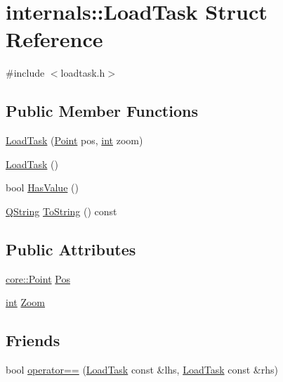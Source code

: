 \hypertarget{structinternals_1_1_load_task}{\section{internals\-:\-:Load\-Task Struct Reference}
\label{structinternals_1_1_load_task}
}


{\ttfamily \#include $<$loadtask.\-h$>$}

\subsection*{Public Member Functions}
\begin{DoxyCompactItemize}
\item 
\hyperlink{group___o_p_map_widget_gaef6bad3b01c5866351b69c90979f260e}{Load\-Task} (\hyperlink{structcore_1_1_point}{Point} pos, \hyperlink{ioapi_8h_a787fa3cf048117ba7123753c1e74fcd6}{int} zoom)
\item 
\hyperlink{group___o_p_map_widget_gab83d811cb8cb0cb08d8c56cad76df071}{Load\-Task} ()
\item 
bool \hyperlink{group___o_p_map_widget_ga158bba758e9847d68a36eb0efee84342}{Has\-Value} ()
\item 
\hyperlink{group___u_a_v_objects_plugin_gab9d252f49c333c94a72f97ce3105a32d}{Q\-String} \hyperlink{group___o_p_map_widget_gadf111b2f1982ddca99c4a295856c3968}{To\-String} () const 
\end{DoxyCompactItemize}
\subsection*{Public Attributes}
\begin{DoxyCompactItemize}
\item 
\hyperlink{structcore_1_1_point}{core\-::\-Point} \hyperlink{group___o_p_map_widget_gaaaf77679e16ef9213c85fbfaff467339}{Pos}
\item 
\hyperlink{ioapi_8h_a787fa3cf048117ba7123753c1e74fcd6}{int} \hyperlink{group___o_p_map_widget_gaee096bc3882220e2ed2b8b167cecb9ad}{Zoom}
\end{DoxyCompactItemize}
\subsection*{Friends}
\begin{DoxyCompactItemize}
\item 
bool \hyperlink{group___o_p_map_widget_ga6780adf9ff8340f912353a6ef6e68751}{operator==} (\hyperlink{structinternals_1_1_load_task}{Load\-Task} const \&lhs, \hyperlink{structinternals_1_1_load_task}{Load\-Task} const \&rhs)
\end{DoxyCompactItemize}



